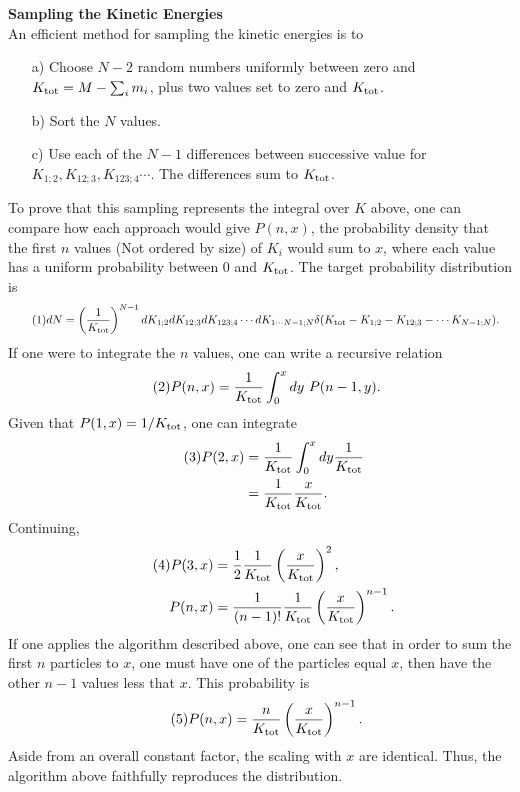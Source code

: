 \documentclass[11pt]{article}
\newcommand\eqnumber{\addtocounter{equation}{1}\tag{\theequation}}
\begin{document}
{\bf Sampling the Kinetic Energies}\\
An efficient method for sampling the kinetic energies is to
\begin{enumerate}
\item[a)]Choose $N-2$ random numbers uniformly between zero and $K_{\rm tot}=M-\sum_im_i$, plus two values set to zero and $K_{\rm tot}$.
\item[b)] Sort the $N$ values.
\item[c)] Use each of the $N-1$ differences between successive value for $K_{1;2}, K_{12;3}, K_{123;4}\cdots$. The differences sum to $K_{\rm tot}$.
\end{enumerate}
To prove that this sampling represents the integral over $K$ above, one can compare how each approach would give $P(n,x)$, the probability density that the first $n$ values (Not ordered by size) of $K_i$ would sum to $x$, where each value has a uniform probability between $0$ and $K_{\rm tot}$. The target probability distribution is
\begin{align*}\eqnumber
dN&=\left(\frac{1}{K_{\rm tot}}\right)^{N-1}dK_{1;2}dK_{12;3}dK_{123;4}\cdots dK_{1\cdots N-1;N}\delta(K_{\rm tot}-K_{1;2}-K_{12;3}-\cdots K_{N-1;N}).
\end{align*}
If one were to integrate the $n$ values, one can write a recursive relation
\begin{align*}\eqnumber
P(n,x)&=\frac{1}{K_{\rm tot}}\int_0^xdy~P(n-1,y). 
\end{align*}
Given that $P(1,x)=1/K_{\rm tot}$, one can integrate
\begin{align*}\eqnumber
P(2,x)&=\frac{1}{K_{\rm tot}}\int_0^xdy \frac{1}{K_{\rm tot}}\\
&=\frac{1}{K_{\rm tot}}\frac{x}{K_{\rm tot}}.
\end{align*}
Continuing,
\begin{align*}\eqnumber
P(3,x)&=\frac{1}{2}\frac{1}{K_{\rm tot}}\left(\frac{x}{K_{\rm tot}}\right)^2,\\
P(n,x)&=\frac{1}{(n-1)!}\frac{1}{K_{\rm tot}}\left(\frac{x}{K_{\rm tot}}\right)^{n-1}.
\end{align*}
If one applies the algorithm described above, one can see that in order to sum the first $n$ particles to $x$, one must have one of the particles equal $x$, then have the other $n-1$ values less that $x$. This probability is
\begin{align*}\eqnumber
P(n,x)&=\frac{n}{K_{\rm tot}}\left(\frac{x}{K_{\rm tot}}\right)^{n-1}.
\end{align*}
Aside from an overall constant factor, the scaling with $x$ are identical. Thus, the algorithm above faithfully reproduces the distribution. 
\end{document}
